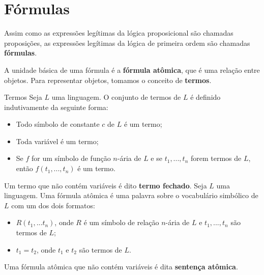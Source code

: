 \section{Fórmulas}

Assim como as expressões legítimas da lógica proposicional são chamadas proposições, as expressões legítimas da lógica de primeira ordem são chamadas \textbf{fórmulas}.

A unidade básica de uma fórmula é a \textbf{fórmula atômica}, que é uma relação entre objetos. Para representar objetos, tomamos o conceito de \textbf{termos}.
\begin{definition}{Termos}
    Seja $L$ uma linguagem. O conjunto de termos de $L$ é definido indutivamente da seguinte forma:
    \begin{itemize}
        \item Todo símbolo de constante $c$ de $L$ é um termo;
        \item Toda variável é um termo;
        \item Se $f$ for um símbolo de função $n$-ária de $L$ e se $t_1,...,t_n$ forem termos de $L$, então $f(t_1,...,t_n)$ é um termo. 
    \end{itemize}
    Um termo que não contém variáveis é dito \textbf{termo fechado}.
    Seja $L$ uma linguagem. Uma fórmula atômica é uma palavra sobre o vocabulário simbólico de $L$ com um dos dois formatos:
    \begin{itemize}
        \item $R(t_1,...t_n)$, onde $R$ é um símbolo de relação $n$-ária de $L$ e $t_1,...,t_n$ são termos de $L$;
        \item $t_1 = t_2$, onde $t_1$ e $t_2$ são termos de $L$.
    \end{itemize} 
    Uma fórmula atômica que não contém variáveis é dita \textbf{sentença atômica}.
\end{definition}